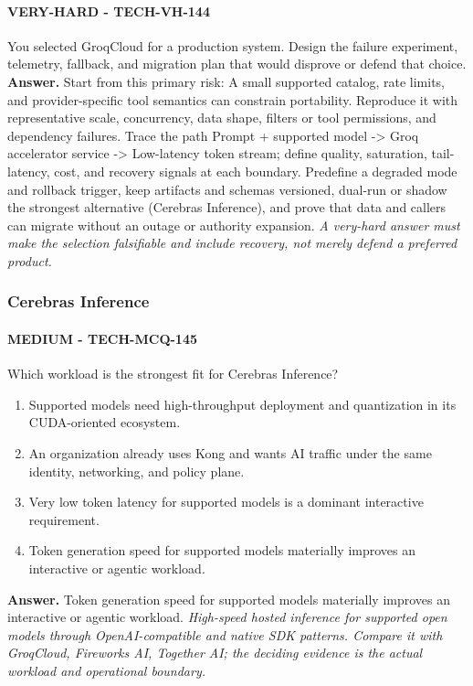 \paragraph{VERY-HARD - TECH-VH-144} You selected GroqCloud for a production system. Design the failure experiment, telemetry, fallback, and migration plan that would disprove or defend that choice.
\textbf{Answer.} Start from this primary risk: A small supported catalog, rate limits, and provider-specific tool semantics can constrain portability. Reproduce it with representative scale, concurrency, data shape, filters or tool permissions, and dependency failures. Trace the path Prompt + supported model -> Groq accelerator service -> Low-latency token stream; define quality, saturation, tail-latency, cost, and recovery signals at each boundary. Predefine a degraded mode and rollback trigger, keep artifacts and schemas versioned, dual-run or shadow the strongest alternative (Cerebras Inference), and prove that data and callers can migrate without an outage or authority expansion.
\textit{A very-hard answer must make the selection falsifiable and include recovery, not merely defend a preferred product.}
\subsubsection*{Cerebras Inference}
\paragraph{MEDIUM - TECH-MCQ-145} Which workload is the strongest fit for Cerebras Inference?
\begin{enumerate}[label=\Alph*.]
\item Supported models need high-throughput deployment and quantization in its CUDA-oriented ecosystem.
\item An organization already uses Kong and wants AI traffic under the same identity, networking, and policy plane.
\item Very low token latency for supported models is a dominant interactive requirement.
\item Token generation speed for supported models materially improves an interactive or agentic workload.
\end{enumerate}
\textbf{Answer.} Token generation speed for supported models materially improves an interactive or agentic workload.
\textit{High-speed hosted inference for supported open models through OpenAI-compatible and native SDK patterns. Compare it with GroqCloud, Fireworks AI, Together AI; the deciding evidence is the actual workload and operational boundary.}
